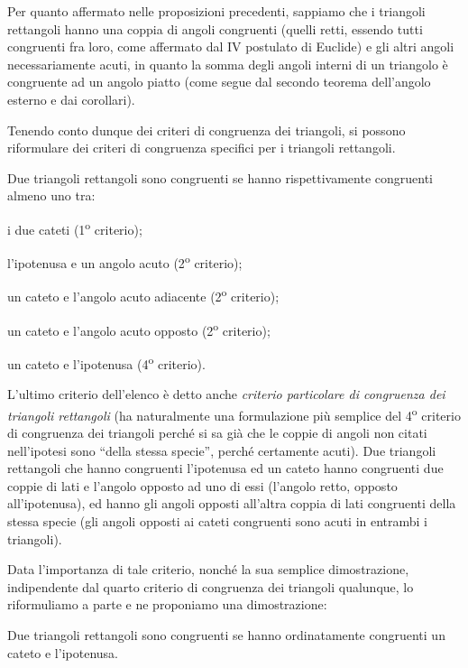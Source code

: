 Per quanto affermato nelle proposizioni precedenti, sappiamo che i 
triangoli rettangoli hanno una coppia di angoli congruenti (quelli 
retti, essendo tutti congruenti fra loro, come affermato dal IV 
postulato di Euclide) e gli altri angoli necessariamente acuti, in 
quanto la somma degli angoli interni di un triangolo è congruente ad 
un angolo piatto (come segue dal secondo teorema dell'angolo esterno 
e dai corollari).

Tenendo conto dunque dei criteri di congruenza dei triangoli, si 
possono riformulare dei criteri di congruenza specifici per i 
triangoli rettangoli.

\begin{teorema}
Due triangoli rettangoli sono congruenti se hanno rispettivamente 
congruenti almeno uno tra:
\begin{itemize*}
\item i due cateti (1\textsuperscript{o} criterio);
\item l'ipotenusa e un angolo acuto (2\textsuperscript{o} criterio);
\item un cateto e l'angolo acuto adiacente (2\textsuperscript{o} 
criterio);
\item un cateto e l'angolo acuto opposto (2\textsuperscript{o} 
criterio);
\item un cateto e l'ipotenusa (4\textsuperscript{o} criterio).
\end{itemize*}
\end{teorema}

L'ultimo criterio dell'elenco è detto anche \emph{criterio 
particolare di congruenza dei triangoli rettangoli} (ha naturalmente 
una formulazione più semplice del 4\textsuperscript{o} criterio di 
congruenza dei triangoli perché si sa già che le coppie di angoli non 
citati nell'ipotesi sono ``della stessa specie'', perché certamente 
acuti). Due triangoli rettangoli che hanno congruenti l'ipotenusa ed 
un cateto hanno congruenti due coppie di lati e l'angolo opposto ad 
uno di essi (l'angolo retto, opposto all'ipotenusa), ed hanno gli 
angoli opposti all'altra coppia di lati congruenti della stessa 
specie (gli angoli opposti ai cateti congruenti sono acuti in entrambi 
i triangoli). 

Data l'importanza di tale criterio, nonché la sua semplice 
dimostrazione, indipendente dal quarto criterio di congruenza dei 
triangoli qualunque, lo riformuliamo a parte e ne proponiamo una 
dimostrazione:
\begin{teorema}
Due triangoli rettangoli sono congruenti se hanno ordinatamente 
congruenti un cateto e l'ipotenusa.
\end{teorema}

